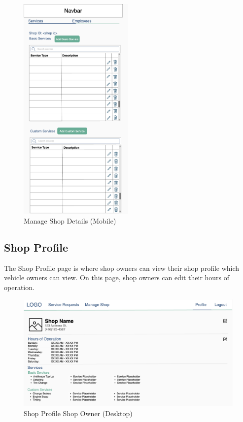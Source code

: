 \documentclass[12pt, titlepage]{article}
\begin{document}
\begin{figure}[H]
	\centering
	\includegraphics[width=0.5\textwidth]{mockups/Manage Shop (Shop Settings) (Mobile).png}
	\caption{Manage Shop \textemdash{} Details (Mobile)}
\end{figure}

\subsection{Shop Profile}
The Shop Profile page is where shop owners can view their shop profile which vehicle owners can
view. On this page, shop owners can edit their hours of operation.

\begin{figure}[H]
	\centering
	\includegraphics[width=\textwidth]{mockups/Shop Profile (Shop Owner) (Desktop).png}
	\caption{Shop Profile \textemdash{} Shop Owner (Desktop)}
\end{figure}
\end{document}

